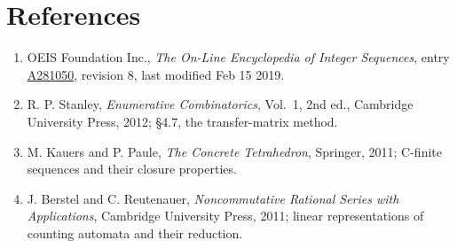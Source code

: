 \documentclass[11pt]{article}
\theoremstyle{definition}
\begin{document}
\section{References}

\begin{enumerate}

\item OEIS Foundation Inc., \emph{The On-Line Encyclopedia of Integer Sequences}, entry \href{https://oeis.org/A281050}{A281050}, revision 8, last modified Feb 15 2019.

\item R. P. Stanley, \emph{Enumerative Combinatorics}, Vol.~1, 2nd ed., Cambridge University Press, 2012; \S4.7, the transfer-matrix method.

\item M. Kauers and P. Paule, \emph{The Concrete Tetrahedron}, Springer, 2011; C-finite sequences and their closure properties.

\item J. Berstel and C. Reutenauer, \emph{Noncommutative Rational Series with Applications}, Cambridge University Press, 2011; linear representations of counting automata and their reduction.

\end{enumerate}
\end{document}
